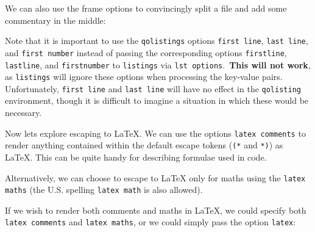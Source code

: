 \documentclass{article}
\newcommand{\ttt}[1]{\texttt{#1}}
\begin{document}
We can also use the frame options to convincingly split a file and add some commentary in the middle:
\begin{qolisting}[lst options = {language = {[LaTeX]TeX}}, frame, background]
\lipsum[1]
\end{qolisting}

\lipsum[1]

Note that it is important to use the \ttt{qolistings} options \ttt{first line}, \ttt{last line}, and \ttt{first number} instead of passing the corresponding options \ttt{firstline}, \ttt{lastline}, and \ttt{firstnumber} to \ttt{listings} via \ttt{lst options}.\ \textbf{This will not work}, as \ttt{listings} will ignore these options when processing the key-value pairs. Unfortunately, \ttt{first line} and \ttt{last line} will have no effect in the \ttt{qolisting} environment, though it is difficult to imagine a situation in which these would be necessary.


Now lets explore escaping to \LaTeX{}. We can use the options \ttt{latex comments} to render anything contained within the default escape tokens (\ttt{(*} and \ttt{*)}) as \LaTeX{}. This can be quite handy for describing formulae used in code.
\begin{qolisting}[lst options = {language = {[LaTeX]TeX}}, frame, background]
\end{qolisting}

Alternatively, we can choose to escape to \LaTeX{} only for maths using the \ttt{latex maths} (the U.S. spelling \ttt{latex math} is also allowed).
\begin{qolisting}[lst options = {language = {[LaTeX]TeX}}, frame, background]
\end{qolisting}


If we wish to render both comments and maths in \LaTeX{}, we could specify both \ttt{latex comments} and \ttt{latex maths}, or we could simply pass the option \ttt{latex}:
\begin{qolisting}[lst options = {language = {[LaTeX]TeX}}, frame, background]
\end{qolisting}
\end{document}
